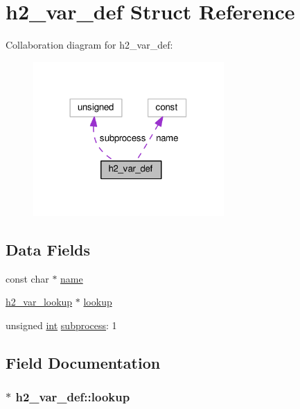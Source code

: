 \hypertarget{structh2__var__def}{}\section{h2\+\_\+var\+\_\+def Struct Reference}
\label{structh2__var__def}


Collaboration diagram for h2\+\_\+var\+\_\+def\+:
\nopagebreak
\begin{figure}[H]
\begin{center}
\leavevmode
\includegraphics[width=206pt]{structh2__var__def__coll__graph}
\end{center}
\end{figure}
\subsection*{Data Fields}
\begin{DoxyCompactItemize}
\item 
const char $\ast$ \hyperlink{structh2__var__def_ab84d4a8ee14f2aee2f79da0d62cb18c6}{name}
\item 
\hyperlink{mod__http2_8c_a20e83423858548973edabb655e0049c5}{h2\+\_\+var\+\_\+lookup} $\ast$ \hyperlink{structh2__var__def_ad1c4405aed335156fd8a6c01073e2436}{lookup}
\item 
unsigned \hyperlink{pcre_8txt_a42dfa4ff673c82d8efe7144098fbc198}{int} \hyperlink{structh2__var__def_a78def6d6a9ef79dd3d5d95d21a0540da}{subprocess}\+: 1
\end{DoxyCompactItemize}


\subsection{Field Documentation}
\subsubsection[{\texorpdfstring{lookup}{lookup}}]{$\ast$ h2\+\_\+var\+\_\+def\+::lookup}\hypertarget{structh2__var__def_ad1c4405aed335156fd8a6c01073e2436}{}\label{structh2__var__def_ad1c4405aed335156fd8a6c01073e2436}
